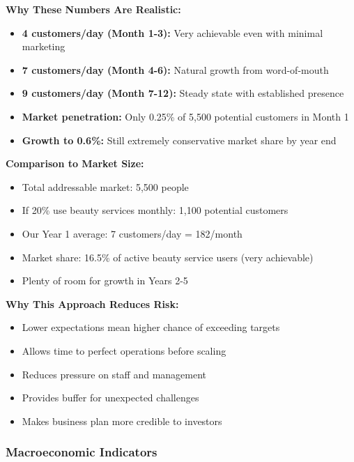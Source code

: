 \documentclass[a4paper,12pt]{article}
\begin{document}
\begin{tcolorbox}[mybox, title=\textbf{Ultra-Conservative Assumptions Rationale}]
\textbf{Why These Numbers Are Realistic:}
\begin{itemize}[leftmargin=1em, itemsep=0pt]
    \item \textbf{4 customers/day (Month 1-3):} Very achievable even with minimal marketing
    \item \textbf{7 customers/day (Month 4-6):} Natural growth from word-of-mouth
    \item \textbf{9 customers/day (Month 7-12):} Steady state with established presence
    \item \textbf{Market penetration:} Only 0.25\% of 5,500 potential customers in Month 1
    \item \textbf{Growth to 0.6\%:} Still extremely conservative market share by year end
\end{itemize}

\textbf{Comparison to Market Size:}
\begin{itemize}[leftmargin=1em, itemsep=0pt]
    \item Total addressable market: 5,500 people
    \item If 20\% use beauty services monthly: 1,100 potential customers
    \item Our Year 1 average: 7 customers/day = 182/month
    \item Market share: 16.5\% of active beauty service users (very achievable)
    \item Plenty of room for growth in Years 2-5
\end{itemize}

\textbf{Why This Approach Reduces Risk:}
\begin{itemize}[leftmargin=1em, itemsep=0pt]
    \item Lower expectations mean higher chance of exceeding targets
    \item Allows time to perfect operations before scaling
    \item Reduces pressure on staff and management
    \item Provides buffer for unexpected challenges
    \item Makes business plan more credible to investors
\end{itemize}
\end{tcolorbox}

\subsubsection{Macroeconomic Indicators}
\end{document}
